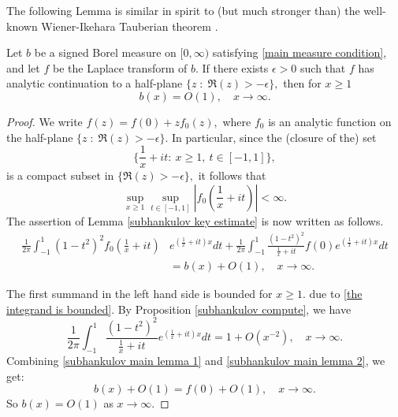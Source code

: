     The following Lemma is similar in spirit to (but much stronger than) the well-known Wiener-Ikehara Tauberian theorem \cite[Theorem 14.1]{Shubin-pseudo-2001}.
    \begin{lem}\label{subhankulov main lemma} 
        Let $b$ be a signed Borel measure on $[0,\infty)$ satisfying \eqref{main measure condition}, and let $f$
        be the Laplace transform of $b.$ If there exists $\epsilon>0$ such that $f$ has analytic continuation to a half-plane $\{z \;:\; \Re(z)>-\epsilon\},$ then
        for $x \geq 1$
        $$b(x)=O(1),\quad x\to\infty.$$
    \end{lem}
    \begin{proof} 
        We write $f(z)=f(0)+zf_0(z),$ where $f_0$ is an analytic function on the half-plane $\{z\;:\;\Re(z)>-\epsilon\}.$ In particular, since the (closure of the) set
        $$\Big\{\frac1x+it:\ x\geq1,\ t\in[-1,1]\Big\},$$
        is a compact subset in $\{\Re(z)>-\epsilon\},$ it follows that
        \begin{equation}\label{the integrand is bounded}
            \sup_{x\geq 1}\sup_{t\in[-1,1]}|f_0(\frac1x+it)|<\infty.
        \end{equation}
        The assertion of Lemma \ref{subhankulov key estimate} is now written as follows.
        \begin{align}
            \frac1{2\pi}\int_{-1}^1(1-t^2)^2f_0(\frac1x+it)&e^{(\frac1x+it)x}dt+\frac1{2\pi}\int_{-1}^1\frac{(1-t^2)^2}{\frac1x+it}f(0)e^{(\frac1x+it)x}dt\nonumber\\
                                                           &=b(x)+O(1),\quad x\to\infty.\label{subhankulov main lemma 1}
        \end{align}

        The first summand in the left hand side is bounded for $x\geq 1.$ due to \eqref{the integrand is bounded}. By Proposition \ref{subhankulov compute}, we have
        \begin{equation}\label{subhankulov main lemma 2}
            \frac1{2\pi}\int_{-1}^1\frac{(1-t^2)^2}{\frac1x+it}e^{(\frac1x+it)x}dt=1+O(x^{-2}),\quad x\to \infty.
        \end{equation}
        Combining \eqref{subhankulov main lemma 1} and \eqref{subhankulov main lemma 2}, we get:
        \begin{equation*}
            b(x)+O(1) = f(0)+O(1),\quad x\to\infty.
        \end{equation*}
        So $b(x) = O(1)$ as $x\to\infty$.
    \end{proof}
    
